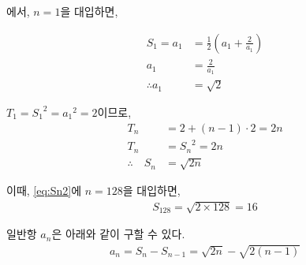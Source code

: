 \documentclass[a4paper,12pt]{article}
\begin{document}
 에서, $n=1$을 대입하면,

\begin{align}
    S_1 = a_1 &= \frac{1}{2}\left(a_1 + \frac{2}{a_1}\right) \nonumber \\
        {a_1} &= \frac{2}{a_1} \nonumber \\
        \therefore a_1 &= \sqrt{2} \label{eq:a_1}
\end{align}

$T_1 = {S_1}^2 = {a_1}^2 = 2$이므로,
\begin{align}
    T_n &= 2 + (n-1) \cdot 2 = 2n \nonumber \\
    T_n &= {S_n}^2 = 2n \nonumber \\
    \therefore \quad S_n &= \sqrt{2n} \label{eq:Sn2}
\end{align}


이때, \cref{eq:Sn2}에 $n=128$을 대입하면,
\begin{align*}
    S_{128} = \sqrt{2\times 128} =16
\end{align*}

일반항 $a_n$은 아래와 같이 구할 수 있다.
\begin{align*}
    a_n = S_n - S_{n-1} = \sqrt{2n} - \sqrt{2(n-1)}
\end{align*}
\end{document}
